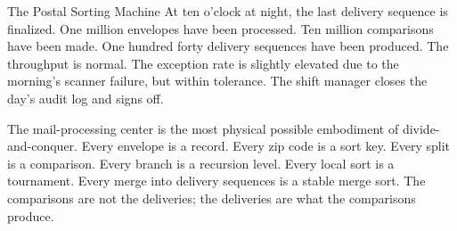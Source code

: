 \begin{coda}{The Postal Sorting Machine}
At ten o'clock at night, the last delivery sequence is finalized.
One million envelopes have been processed. Ten million comparisons
have been made. One hundred forty delivery sequences have been
produced. The throughput is normal. The exception rate is slightly
elevated due to the morning's scanner failure, but within tolerance.
The shift manager closes the day's audit log and signs off.

The mail-processing center is the most physical possible
embodiment of divide-and-conquer. Every envelope is a record. Every
zip code is a sort key. Every split is a comparison. Every branch is
a recursion level. Every local sort is a tournament. Every merge into
delivery sequences is a stable merge sort. The comparisons are not
the deliveries; the deliveries are what the comparisons produce.

\end{coda}
